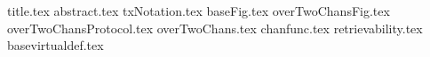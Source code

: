 \documentclass{llncs}
\begin{document}
\pagestyle{plain}
{title.tex}
{abstract.tex}
{txNotation.tex}
{baseFig.tex}
{overTwoChansFig.tex}
{overTwoChansProtocol.tex}
{overTwoChans.tex}
{chanfunc.tex}
{retrievability.tex}
{basevirtualdef.tex}

\end{document}
